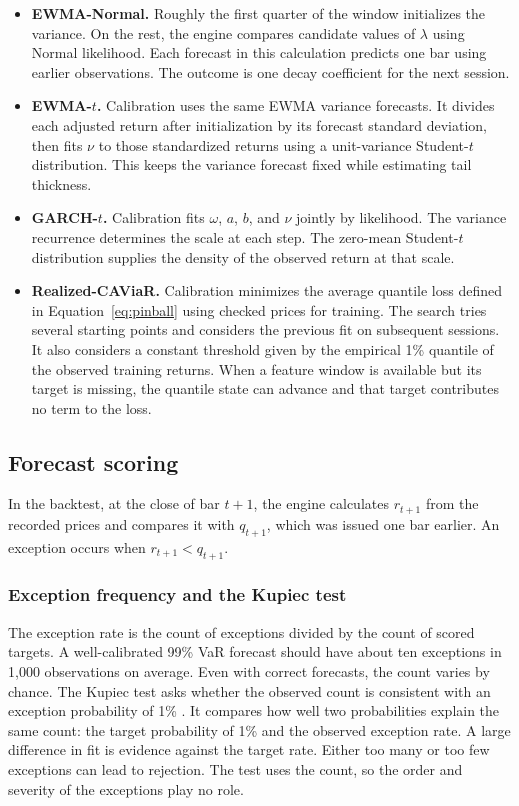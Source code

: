 \documentclass[
	12pt,				%
	openright,			%
	twoside,			%
	a4paper,
	chapter=TITLE,
	english				%
	]{abntex2}
\begin{document}
\begin{itemize}
  \item \textbf{EWMA-Normal.} Roughly the first quarter of the window initializes the variance. On the rest, the engine compares candidate values of $\lambda$ using Normal likelihood. Each forecast in this calculation predicts one bar using earlier observations. The outcome is one decay coefficient for the next session.
  \item \textbf{EWMA-$t$.} Calibration uses the same EWMA variance forecasts. It divides each adjusted return after initialization by its forecast standard deviation, then fits $\nu$ to those standardized returns using a unit-variance Student-$t$ distribution. This keeps the variance forecast fixed while estimating tail thickness.
  \item \textbf{GARCH-$t$.} Calibration fits $\omega$, $a$, $b$, and $\nu$ jointly by likelihood. The variance recurrence determines the scale at each step. The zero-mean Student-$t$ distribution supplies the density of the observed return at that scale.
  \item \textbf{Realized-CAViaR.} Calibration minimizes the average quantile loss defined in Equation~\ref{eq:pinball} using checked prices for training. The search tries several starting points and considers the previous fit on subsequent sessions. It also considers a constant threshold given by the empirical 1\% quantile of the observed training returns. When a feature window is available but its target is missing, the quantile state can advance and that target contributes no term to the loss.
\end{itemize}

\subsection{Forecast scoring} \label{sec:scoring}

In the backtest, at the close of bar $t+1$, the engine calculates $r_{t+1}$ from the recorded prices and compares it with $q_{t+1}$, which was issued one bar earlier. An exception occurs when $r_{t+1}<q_{t+1}$.

\subsubsection{Exception frequency and the Kupiec test}

The exception rate is the count of exceptions divided by the count of scored targets. A well-calibrated 99\% VaR forecast should have about ten exceptions in 1,000 observations on average. Even with correct forecasts, the count varies by chance. The Kupiec test asks whether the observed count is consistent with an exception probability of 1\% \cite{kupiec-1995}. It compares how well two probabilities explain the same count: the target probability of 1\% and the observed exception rate. A large difference in fit is evidence against the target rate. Either too many or too few exceptions can lead to rejection. The test uses the count, so the order and severity of the exceptions play no role.
\end{document}
